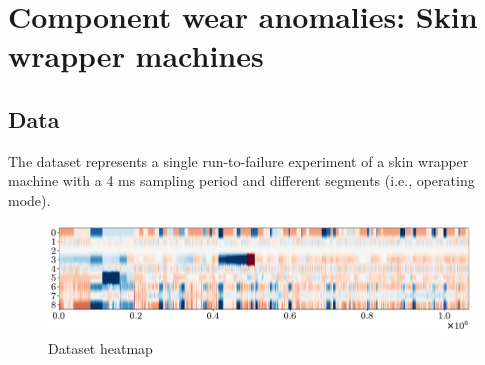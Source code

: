 \chapter{Component wear anomalies: Skin wrapper machines}


\section{Data}

The dataset represents a single run-to-failure experiment of a skin wrapper machine with a 4 ms sampling period and different segments (i.e., operating mode).

\begin{figure}[H]
    \centering
    \includegraphics[width=0.9\linewidth]{./img/_skinwrapper_heatmap.pdf}
    \caption{Dataset heatmap}
\end{figure}

